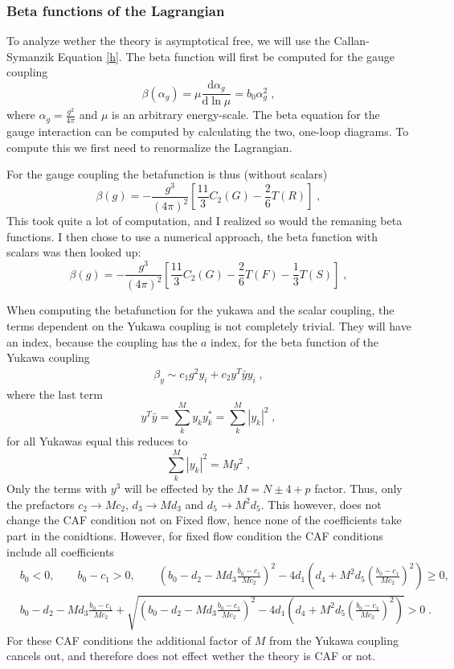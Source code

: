 \subsubsection{Beta functions of the Lagrangian}
To analyze wether the theory is asymptotical free, we will use the Callan-Symanzik Equation \ref{h}. The beta function will first be computed for the gauge coupling
\begin{equation}
    \beta(\alpha_g)=\mu\frac{\text{d}\alpha_g}{\text{d}\ln\mu}= b_0 \alpha_g^2\;,
\end{equation}
where $\alpha_g=\frac{g^2}{4\pi}$ and $\mu$ is an arbitrary energy-scale. The beta equation for the gauge interaction can be computed by calculating the two, one-loop diagrams. To compute this we first need to renormalize the Lagrangian.  

For the gauge coupling the betafunction is thus (without scalars)
\begin{equation}
    \beta(g)=-\frac{g^3}{(4\pi)^2}\left[\frac{11}{3}C_2(G)-\frac{2}{6}T(R)\right]\;,
\end{equation}
This took quite a lot of computation, and I realized so would the remaning beta functions. I then chose to use a numerical approach, the beta function with scalars was then looked up:
\begin{equation}
    \beta(g)=-\frac{g^3}{(4\pi)^2}\left[\frac{11}{3}C_2(G)-\frac{2}{6}T(F)-\frac{1}{3}T(S)\right]\;,
\end{equation}

When computing the betafunction for the yukawa and the scalar coupling, the terms dependent on the Yukawa coupling is not completely trivial. They will have an index, because the coupling has the $a$ index, for the beta function of the Yukawa coupling
\begin{align}
    \beta_{y}\sim c_1g^2y_i + c_2 y^T \bar y y_i\;, 
\end{align} 
where the last term
\begin{equation}
    y^T \bar y =\sum_k^M y_k y_k^*=\sum^M_k |y_k|^2\;,
\end{equation}
for all Yukawas equal this reduces to
\begin{equation}
   \sum^M_k |y_k|^2=My^2\;,
\end{equation}
Only the terms with $y^3$ will be effected by the $M=N\pm4 +p$ factor. Thus, only the prefactors $c_2\to M c_2$,  $d_3\to M d_3$ and  $d_5\to M^2 d_5$. This however, does not change the CAF condition not on Fixed flow, hence none of the coefficients take part in the conidtions. However, for fixed flow condition the CAF conditions include all coefficients
\begin{align}
    &b_0<0,\quad\quad b_0-c_1>0,\quad\quad \left(b_0-d_2-Md_3\frac{b_0-c_1}{Mc_2}\right)^2-4d_1\left(d_4+M^2d_5\left(\frac{b_0-c_1}{Mc_2}\right)^2\right)\geq 0,\\&b_0-d_2- Md_3 \frac{b_0-c_1}{Mc_2}+\sqrt{\left(b_0-d_2 - Md_3 \frac{b_0-c_1}{Mc_2}\right)^2-4d_1\left(d_4+M^2d_5\left(\frac{b_0-c_1}{Mc_2}\right)^2\right)}>0\;.
\end{align}  
For these CAF conditions the additional factor of $M$ from the Yukawa coupling cancels out, and therefore does not effect wether the theory is CAF or not. 
